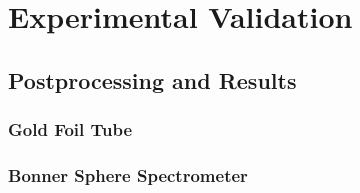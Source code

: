 
\cleardoublepage


\chapter{Experimental Validation}



\section{Postprocessing and Results}


\subsection{Gold Foil Tube}


\subsection{Bonner Sphere Spectrometer}
